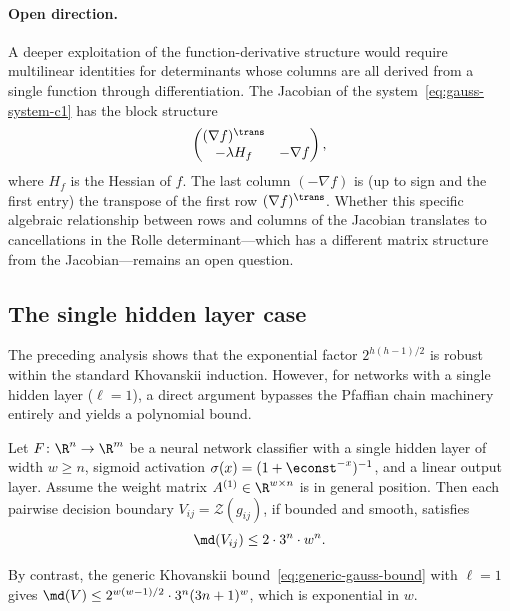 \paragraph{Open direction.}
A deeper exploitation of the function-derivative structure would require multilinear identities for determinants whose columns are all derived from a single function through differentiation. The Jacobian of the system~\eqref{eq:gauss-system-c1} has the block structure
\begin{equation*}
  \begin{pmatrix} (\nabla f)^\trans \\ -\lambda H_f & -\nabla f \end{pmatrix},
\end{equation*}
where $H_f$ is the Hessian of $f$. The last column $(-\nabla f)$ is (up to sign and the first entry) the transpose of the first row $(\nabla f)^\trans$. Whether this specific algebraic relationship between rows and columns of the Jacobian translates to cancellations in the Rolle determinant---which has a different matrix structure from the Jacobian---remains an open question.

\subsection{The single hidden layer case}\label{subsec:single-layer}

The preceding analysis shows that the exponential factor $2^{h(h-1)/2}$ is robust within the standard Khovanskii induction. However, for networks with a single hidden layer ($\ell = 1$), a direct argument bypasses the Pfaffian chain machinery entirely and yields a polynomial bound.

\begin{proposition}\label{prop:single-layer-degree}
  Let $F\colon \R^n \to \R^m$ be a neural network classifier with a single hidden layer of width $w\geq n$, sigmoid activation $\sigma(x) = (1+\econst^{-x})^{-1}$, and a linear output layer. Assume the weight matrix $A^{(1)}\in \R^{w\times n}$ is in general position. Then each pairwise decision boundary $V_{ij} = \mathcal{Z}(g_{ij})$, if bounded and smooth, satisfies
  \begin{equation}\label{eq:single-layer-bound}
    \md(V_{ij}) \leq 2\cdot 3^n \cdot w^n.
  \end{equation}
\end{proposition}

By contrast, the generic Khovanskii bound~\eqref{eq:generic-gauss-bound} with $\ell = 1$ gives $\md(V) \leq 2^{w(w-1)/2}\cdot 3^n(3n+1)^w$, which is exponential in $w$.

